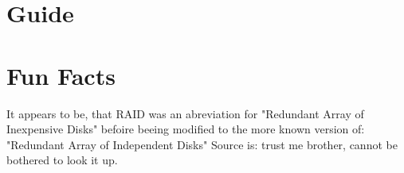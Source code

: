 \documentclass{article}
\begin{document}
\section{Guide}

\section*{Fun Facts}
It appears to be, that RAID was an abreviation for "Redundant Array of Inexpensive Disks" befoire beeing
modified to the more known version of: "Redundant Array of Independent Disks"
Source is: trust me brother, cannot be bothered to look it up.



\end{document}
